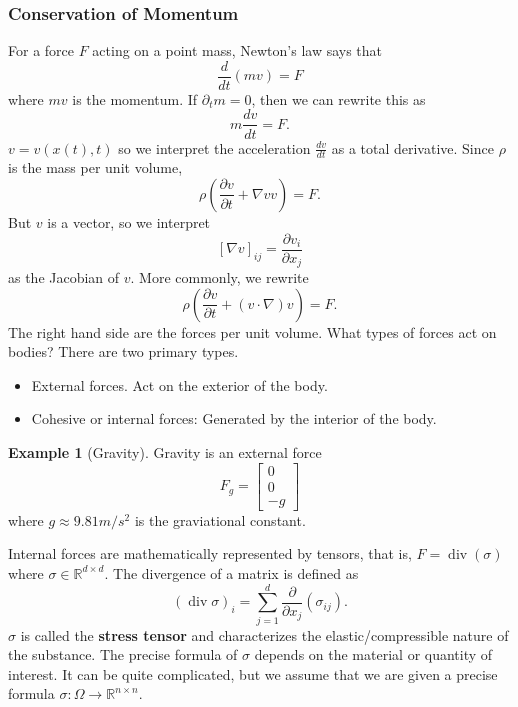 \documentclass{article}
\theoremstyle{definition}
\newtheorem{example}[theorem]{Example}
\theoremstyle{definition}
\newcommand{\R}{\mathbb{R}}
\begin{document}
\subsubsection{Conservation of Momentum}
For a force $F$ acting on a point mass, Newton's law says that
$$\frac{d}{dt}(mv)=F$$
where $mv$ is the momentum. If $\partial_{t}m=0$, then we can rewrite this as
$$m\frac{dv}{dt}=F.$$
$v=v(x(t),t)$ so we interpret the acceleration $\frac{dv}{dt}$ as a total derivative. Since $\rho$ is the mass per unit volume,
$$\rho\left(\frac{\partial v}{\partial t}+\nabla v v\right)=F.$$
But $v$ is a vector, so we interpret
$$[\nabla v]_{ij}=\frac{\partial v_i}{\partial x_j}$$
as the Jacobian of $v$. More commonly, we rewrite
$$\rho\left(\frac{\partial v}{\partial t}+(v\cdot \nabla)v\right)=F.$$
The right hand side are the forces per unit volume. What types of forces act on bodies? There are two primary types.
\begin{itemize}
    \item External forces. Act on the exterior of the body.
    \item Cohesive or internal forces: Generated by the interior of the body.
\end{itemize}
\begin{example}[Gravity]
    Gravity is an external force
    $$F_{g}=\begin{bmatrix}
        0 \\
        0 \\
        -g
    \end{bmatrix}$$
    where $g\approx 9.81 m/s^2$ is the graviational constant.
\end{example}
Internal forces are mathematically represented by tensors, that is, $F=\operatorname{div}(\sigma)$ where $\sigma\in \R^{d\times d}$. The divergence of a matrix is defined as
$$(\operatorname{div}\sigma)_{i}=\sum_{j=1}^{d}\frac{\partial}{\partial x_j}(\sigma_{ij}).$$
$\sigma$ is called the \textbf{stress tensor} and characterizes the elastic/compressible nature of the substance. The precise formula of $\sigma$ depends on the material or quantity of interest. It can be quite complicated, but we assume that we are given a precise formula $\sigma:\Omega\to \R^{n\times n}$.
\end{document}
